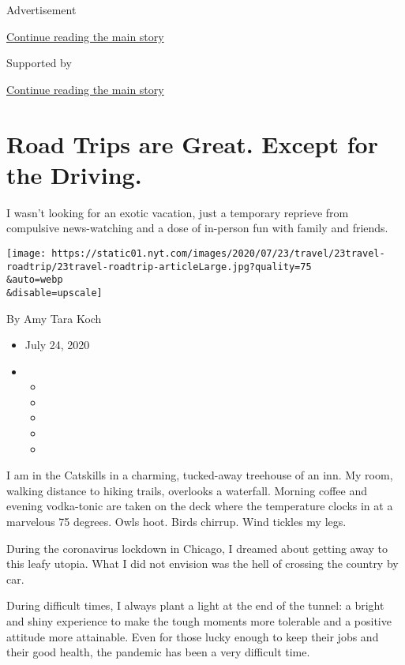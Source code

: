 Advertisement

\protect\hyperlink{after-top}{Continue reading the main story}

Supported by

\protect\hyperlink{after-sponsor}{Continue reading the main story}

\hypertarget{road-trips-are-great-except-for-the-driving}{%
\section{Road Trips are Great. Except for the
Driving.}\label{road-trips-are-great-except-for-the-driving}}

I wasn't looking for an exotic vacation, just a temporary reprieve from
compulsive news-watching and a dose of in-person fun with family and
friends.

\texttt{[image: https://static01.nyt.com/images/2020/07/23/travel/23travel-roadtrip/23travel-roadtrip-articleLarge.jpg?quality=75\\\&auto=webp\\\&disable=upscale]}

By Amy Tara Koch

\begin{itemize}
\item
  July 24, 2020
\item
  \begin{itemize}
  \item
  \item
  \item
  \item
  \item
  \end{itemize}
\end{itemize}

I am in the Catskills in a charming, tucked-away treehouse of an inn. My
room, walking distance to hiking trails, overlooks a waterfall. Morning
coffee and evening vodka-tonic are taken on the deck where the
temperature clocks in at a marvelous 75 degrees. Owls hoot. Birds
chirrup. Wind tickles my legs.

During the coronavirus lockdown in Chicago, I dreamed about getting away
to this leafy utopia. What I did not envision was the hell of crossing
the country by car.

During difficult times, I always plant a light at the end of the tunnel:
a bright and shiny experience to make the tough moments more tolerable
and a positive attitude more attainable. Even for those lucky enough to
keep their jobs and their good health, the pandemic has been a very
difficult time.

